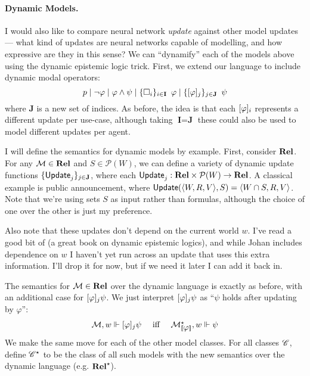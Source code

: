 \documentclass[letterpaper]{article}
\begin{document}
\paragraph*{Dynamic Models.}

I would also like to compare neural network \emph{update} against other model updates --- what kind of updates are neural networks capable of modelling, and how expressive are they in this sense?  We can ``dynamify'' each of the models above using the dynamic epistemic logic trick.  First, we extend our language to include dynamic modal operators:
\[
    p \mid \neg \varphi \mid \varphi \land \psi \mid \{ \Box_i \}_{i \in \textbf{I}} \hspace*{0.5em} \varphi \mid \{ [\varphi]_j \}_{j \in \textbf{J}} \hspace*{0.5em} \psi
\]
where \textbf{J} is a new set of indices.  As before, the idea is that each $[\varphi]_i$ represents a different update per use-case, although taking $\textbf{I} = \textbf{J}$ these could also be used to model different updates per agent.  

I will define the semantics for dynamic models by example.  First, consider $\textrm{\textbf{Rel}}$.  For any $\mathcal{M} \in \textrm{\textbf{Rel}}$ and $S \in \mathcal{P}(W)$, we can define a variety of dynamic update functions $\{ \mathsf{Update}_j \}_{j \in \textbf{J}}$, where each $\mathsf{Update}_j : \textrm{\textbf{Rel}} \times \mathcal{P}(W) \to \textrm{\textbf{Rel}}$.  A classical example is public announcement, where $\mathsf{Update}(\langle W, R, V \rangle, S) = \langle W \cap S, R, V \rangle$.  Note that we're using sets $S$ as input rather than formulas, although the choice of one over the other is just my preference.

Also note that these updates don't depend on the current world $w$.  I've read a good bit of \cite{van2011logicaldynamics} (a great book on dynamic epistemic logics), and while Johan includes dependence on $w$ I haven't yet run across an update that uses this extra information.  I'll drop it for now, but if we need it later I can add it back in.

The semantics for $\mathcal{M} \in \textrm{\textbf{Rel}}$ over the dynamic language is exactly as before, with an additional case for $[\varphi]_j \psi$.  We just interpret $[\varphi]_j \psi$ as ``$\psi$ holds after updating by $\varphi$'':
\[
\begin{array}{lcl}
    \mathcal{M}, w \Vdash [\varphi]_j \psi & \mbox{ iff } & \mathcal{M}^\star_{[\![\mbox{\em $ \varphi $\/}]\!]}, w \Vdash \psi
\end{array}
\]
We make the same move for each of the other model classes.  For all classes $\mathscr{C}$, define $\mathscr{C}^\star$ to be the class of all such models with the new semantics over the dynamic language (e.g. $\textrm{\textbf{Rel}}^\star$).
\end{document}
